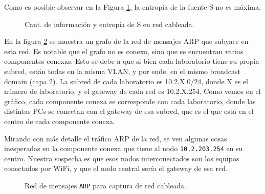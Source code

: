 
Como es posible observar en la Figura \ref{res:esc1:fig1}, la entropía de la fuente S no es máxima. 


\begin{figure}[h]
	\caption{Cant. de información y entropía de S en red cableada.}
    \label{res:esc1:fig1}
\end{figure}

En la figura \ref{res:esc1:fig2} se muestra un grafo de la red de mensajes ARP que subyace en esta red. Es notable que el grafo no es conexo, sino que se encuentran varias componentes conexas. Esto se debe a que si bien cada laboratorio tiene su propia subred, están todas en la misma VLAN, y por ende, en el mismo broadcast domain (capa 2). La subred de cada laboratorio es 10.2.X.0/24, donde X es el número de laboratorio, y el gateway de cada red es 10.2.X.254. Como vemos en el gráfico, cada componente conexa se corresponde con cada laboratorio, donde las distintas PCs se conectan con el gateway de esa subred, que es el que está en el centro de cada componente conexa.

Mirando con más detalle el tráfico ARP de la red, se ven algunas cosas inesperadas en la componente conexa que tiene al nodo \texttt{10.2.203.254} en su centro. Nuestra sospecha es que esos nodos interconectados son los equipos conectados por WiFi, y que el nodo central sería el gateway de esa red.




\begin{figure}[H]
    \caption{Red de mensajes \texttt{ARP} para captura de red cableada.}
    \label{res:esc1:fig2}
\end{figure}



